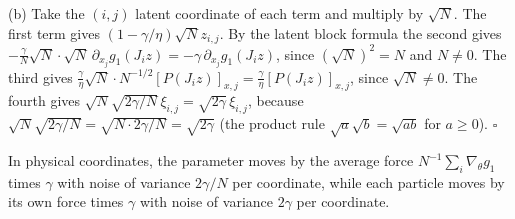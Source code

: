 \documentclass[11pt,a4paper]{article}
\begin{document}
(b) Take the \((i,j)\) latent coordinate of each term and multiply by \(\sqrt N\). The first term gives \((1-\gamma/\eta)\sqrt Nz_{i,j}\). By the latent block formula the second gives \(-\frac\gamma N\sqrt N\cdot\sqrt N\,\partial_{x_j}g_1(J_iz)=-\gamma\,\partial_{x_j}g_1(J_iz)\), since \((\sqrt N)^2=N\) and \(N\ne0\). The third gives \(\frac\gamma\eta\sqrt N\cdot N^{-1/2}[P(J_iz)]_{x,j}=\frac\gamma\eta[P(J_iz)]_{x,j}\), since \(\sqrt N\ne0\). The fourth gives \(\sqrt N\sqrt{2\gamma/N}\,\xi_{i,j}=\sqrt{2\gamma}\,\xi_{i,j}\), because \(\sqrt N\sqrt{2\gamma/N}=\sqrt{N\cdot2\gamma/N}=\sqrt{2\gamma}\) (the product rule \(\sqrt a\sqrt b=\sqrt{ab}\) for \(a\ge0\)). \(\square\)




In physical coordinates, the parameter moves by the average force \(N^{-1}\sum_i\nabla_\theta g_1\) times \(\gamma\) with noise of variance \(2\gamma/N\) per coordinate, while each particle moves by its own force times \(\gamma\) with noise of variance \(2\gamma\) per coordinate.
\end{document}
